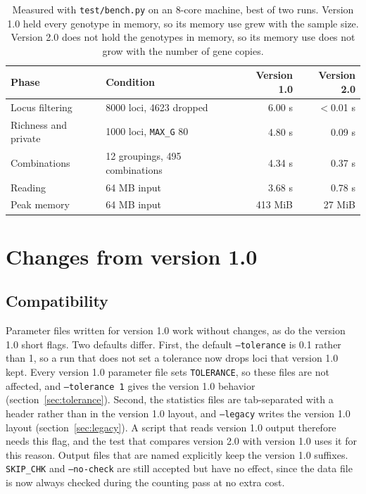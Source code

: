 \documentclass[11pt]{article}
\newcommand{\flag}[1]{\texttt{#1}}
\begin{document}
\begin{table}[htbp]
\centering
\begin{tabular}{llrr}
\toprule
Phase & Condition & Version 1.0 & Version 2.0 \\
\midrule
Locus filtering & 8000 loci, 4623 dropped & 6.00 s & $<$0.01 s \\
Richness and private & 1000 loci, \texttt{MAX\_G} 80 & 4.80 s & 0.09 s \\
Combinations & 12 groupings, 495 combinations & 4.34 s & 0.37 s \\
Reading & 64 MB input & 3.68 s & 0.78 s \\
Peak memory & 64 MB input & 413 MiB & 27 MiB \\
\bottomrule
\end{tabular}
\caption{Measured with \texttt{test/bench.py} on an 8-core machine, best of
two runs. Version 1.0 held every genotype in memory, so its memory use grew
with the sample size. Version 2.0 does not hold the genotypes in memory, so its
memory use does not grow with the number of gene copies.}
\label{tab:perf}
\end{table}

\section{Changes from version 1.0}
\label{sec:changes}

\subsection{Compatibility}

Parameter files written for version 1.0 work without changes, as do the
version 1.0 short flags. Two defaults differ. First, the default
\flag{--tolerance} is 0.1 rather than 1, so a run that does not set a
tolerance now drops loci that version 1.0 kept. Every version 1.0 parameter
file sets \texttt{TOLERANCE}, so these files are not affected, and
\flag{--tolerance 1} gives the version 1.0 behavior
(section~\ref{sec:tolerance}). Second, the statistics files are tab-separated
with a header rather than in the version 1.0 layout, and \flag{--legacy}
writes the version 1.0 layout (section~\ref{sec:legacy}). A script that reads
version 1.0 output therefore needs this flag, and the test that compares
version 2.0 with version 1.0 uses it for this reason. Output files that are
named explicitly keep the version 1.0 suffixes. \texttt{SKIP\_CHK} and
\flag{--no-check} are still accepted but have no effect, since the data file is
now always checked during the counting pass at no extra cost.
\end{document}
